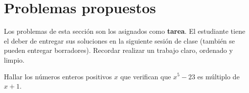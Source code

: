 \section{Problemas propuestos}

Los problemas de esta sección son los asignados como \textbf{tarea}.
El estudiante tiene el deber de entregar sus soluciones en la siguiente sesión de clase (también se pueden entregar borradores).
Recordar realizar un trabajo claro, ordenado y limpio.

\begin{exercise}
    Hallar los números enteros positivos $x$ que verifican que $x^5 - 23$ es múltiplo de $x + 1$.
\end{exercise}